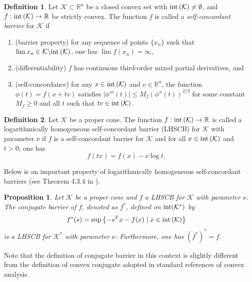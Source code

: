 \documentclass[10pt]{article}
\theoremstyle{definition}
\newtheorem{defin}{Definition}
\theoremstyle{plain}
\newtheorem{prop}{Proposition}
\begin{document}
\begin{defin}
	Let $\mathcal{K} \subset \mathbb{R}^n$ be a closed convex set with $\textnormal{int}\left(\mathcal{K}\right) \neq \emptyset$, and $f: \textnormal{int} \left(\mathcal{K}\right) \rightarrow \mathbb{R}$ be strictly convex. The function $f$ is called a \textit{self-concordant barrier} for $\mathcal{K}$  if 
	\begin{enumerate}
		\item (barrier property) for any sequence of points $\{x_n\}$ such that $\lim x_n \in \mathcal{K}\backslash \textnormal{int}\left(\mathcal{K}\right)$, one has $\lim f(x_n) = \infty$,
		\item (differentiability) $f$ has continuous third-order mixed partial derivatives, and
		\item (self-concordance) for any $x \in \textnormal{int}\left(\mathcal{K}\right)$ and $v \in \mathbb{R}^n$, the function $\phi(t) = f(x+tv)$ satisfies $|\phi ''' (t)|\leq M_f \left(\phi '' (t)\right)^{2/3}$ for some constant $M_f \geq 0$ and all $t$ such that $tv \in \textnormal{int}\left(\mathcal{K}\right)$.
	\end{enumerate}
\end{defin}

\begin{defin}
	Let $\mathcal{K}$ be a proper cone. The function $f: \textnormal{int}\left(\mathcal{K}\right)\rightarrow \mathbb{R}$ is called a logarithmically homogeneous self-concordant barrier (LHSCB) for $\mathcal{K}$ with parameter $\nu$ if $f$ is a self-concordant barrier for $\mathcal{K}$ and for all $x \in \textnormal{int}\left(\mathcal{K}\right)$ and $t>0$, one has 
	\[f(tx) = f(x) - \nu \log t.\]
\end{defin}

Below is an important property of logarithmically homogeneous self-concordant barriers (see Theorem 4.3.4 in \cite{Akle_thesis}).
\begin{prop} \label{conjugate_of_LHSCB_is_LHSCB_for_dual}
	Let $\mathcal{K}$ be a proper cone and $f$ a LHSCB for $\mathcal{K}$ with parameter $\nu$. The \textnormal{conjugate barrier} of $f$, denoted as $f^*$, defined on $\textnormal{int}(\mathcal{K}^*)$ by 
	\[f^*(s) = \sup \left\{-s^Tx -f(x) \mid x\in \textnormal{int}\left(\mathcal{K}\right)  \right\}\]
	is a LHSCB for $\mathcal{K}^*$ with parameter $\nu$. Furthermore, one has $(f^*)^* = f$.
\end{prop}
Note that the definition of conjugate barrier in this context is slightly different from the definition of convex conjugate adopted in standard references of convex analysis. \\
\end{document}
